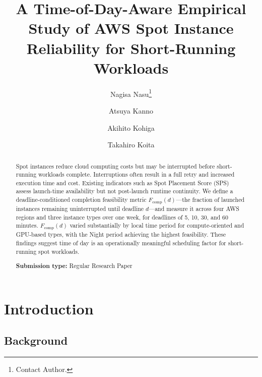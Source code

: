 \documentclass[runningheads]{llncs}
\begin{document}
%
\title{A Time-of-Day-Aware Empirical Study of AWS Spot Instance Reliability for Short-Running Workloads}
%
%
\author{Nagisa Nasu\thanks{Contact Author.} \and Atsuya Kanno \and Akihito Kohiga \and Takahiro Koita}
%
%

\maketitle

\begin{abstract}
Spot instances reduce cloud computing costs but may be interrupted before short-running workloads complete. Interruptions often result in a full retry and increased execution time and cost. Existing indicators such as Spot Placement Score (SPS) assess launch-time availability but not post-launch runtime continuity. We define a deadline-conditioned completion feasibility metric $F_{\mathrm{comp}}(d)$---the fraction of launched instances remaining uninterrupted until deadline $d$---and measure it across four AWS regions and three instance types over one week, for deadlines of 5, 10, 30, and 60 minutes. $F_{\mathrm{comp}}(d)$ varied substantially by local time period for compute-oriented and GPU-based types, with the Night period achieving the highest feasibility. These findings suggest time of day is an operationally meaningful scheduling factor for short-running spot workloads.


\noindent\textbf{Submission type:} Regular Research Paper

\end{abstract}

\section{Introduction}

\subsection{Background}
\end{document}
